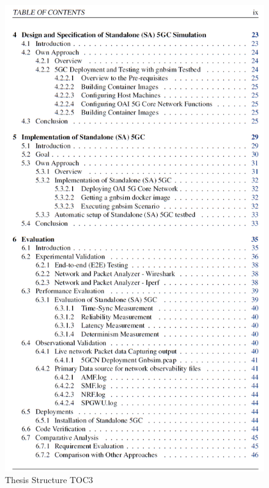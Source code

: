 \begin{figure}
\centering
\includegraphics[scale=0.41]{images/Thesis-TOC3.png} 
\caption{Thesis Structure TOC3}
\label{fig:Thesis-TOC3}
 \end{figure}
 
